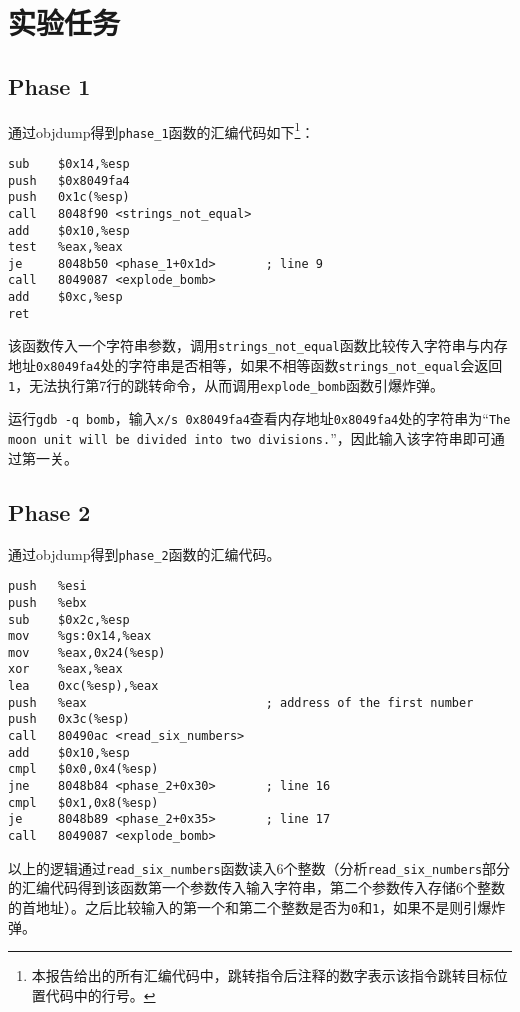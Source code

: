 \documentclass[a4paper, 11pt]{ctexart}
\let\oldsection\section
\renewcommand{\section}{\clearpage\oldsection}
\begin{document}
\section{实验任务}
\subsection{Phase 1}
通过objdump得到\texttt{phase\_1}函数的汇编代码如下\footnote{本报告给出的所有汇编代码中，跳转指令后注释的数字表示该指令跳转目标位置代码中的行号。}：

\begin{verbatim}
sub    $0x14,%esp
push   $0x8049fa4
push   0x1c(%esp)
call   8048f90 <strings_not_equal>
add    $0x10,%esp
test   %eax,%eax
je     8048b50 <phase_1+0x1d>       ; line 9
call   8049087 <explode_bomb>
add    $0xc,%esp
ret
\end{verbatim}

该函数传入一个字符串参数，调用\texttt{strings\_not\_equal}函数比较传入字符串与内存地址\texttt{0x8049fa4}处的字符串是否相等，如果不相等函数\texttt{strings\_not\_equal}会返回\texttt{1}，无法执行第7行的跳转命令，从而调用\texttt{explode\_bomb}函数引爆炸弹。

运行\texttt{gdb -q bomb}，输入\texttt{x/s 0x8049fa4}查看内存地址\texttt{0x8049fa4}处的字符串为“\texttt{The moon unit will be divided into two divisions.}”，因此输入该字符串即可通过第一关。

\subsection{Phase 2}
\label{ssc:phase2}
通过objdump得到\texttt{phase\_2}函数的汇编代码。

\begin{verbatim}
push   %esi
push   %ebx
sub    $0x2c,%esp
mov    %gs:0x14,%eax
mov    %eax,0x24(%esp)
xor    %eax,%eax
lea    0xc(%esp),%eax
push   %eax                         ; address of the first number
push   0x3c(%esp)
call   80490ac <read_six_numbers>
add    $0x10,%esp
cmpl   $0x0,0x4(%esp)
jne    8048b84 <phase_2+0x30>       ; line 16
cmpl   $0x1,0x8(%esp)
je     8048b89 <phase_2+0x35>       ; line 17
call   8049087 <explode_bomb>
\end{verbatim}

以上的逻辑通过\texttt{read\_six\_numbers}函数读入6个整数（分析\texttt{read\_six\_numbers}部分的汇编代码得到该函数第一个参数传入输入字符串，第二个参数传入存储6个整数的首地址）。之后比较输入的第一个和第二个整数是否为\texttt{0}和\texttt{1}，如果不是则引爆炸弹。
\end{document}
